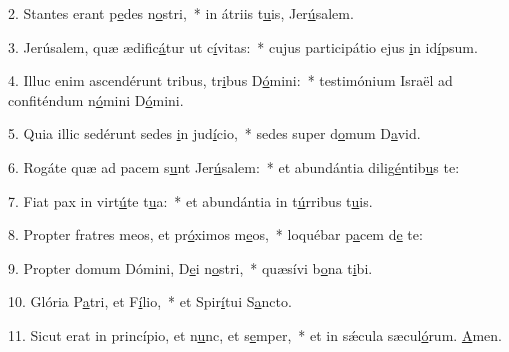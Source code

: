 2. Stantes erant p\uline{e}des n\uline{o}stri,~* in átriis t\uline{u}is, Jer\uline{ú}salem.\par 
3. Jerúsalem, quæ ædific\uline{á}tur ut c\uline{í}vitas:~* cujus participátio ejus \uline{i}n id\uline{í}psum.\par 
4. Illuc enim ascendérunt tribus, tr\uline{i}bus D\uline{ó}mini:~* testimónium Israël ad confiténdum n\uline{ó}mini D\uline{ó}mini.\par 
5. Quia illic sedérunt sedes \uline{i}n jud\uline{í}cio,~* sedes super d\uline{o}mum D\uline{a}vid.\par 
6. Rogáte quæ ad pacem s\uline{u}nt Jer\uline{ú}salem:~* et abundántia dilig\uline{é}ntib\uline{u}s te:\par 
7. Fiat pax in virt\uline{ú}te t\uline{u}a:~* et abundántia in t\uline{ú}rribus t\uline{u}is.\par 
8. Propter fratres meos, et pr\uline{ó}ximos m\uline{e}os,~* loquébar p\uline{a}cem d\uline{e} te:\par 
9. Propter domum Dómini, D\uline{e}i n\uline{o}stri,~* quæsívi b\uline{o}na t\uline{i}bi.\par 
10. Glória P\uline{a}tri, et F\uline{í}lio,~* et Spir\uline{í}tui S\uline{a}ncto.\par 
11. Sicut erat in princípio, et n\uline{u}nc, et s\uline{e}mper,~* et in sǽcula sæcul\uline{ó}rum. \uline{A}men.\par 
